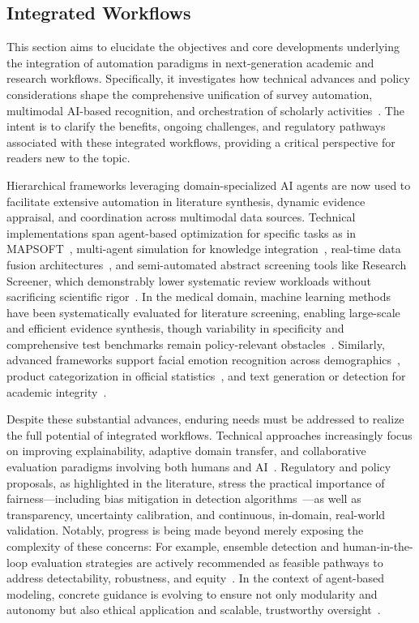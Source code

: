 \documentclass[sigconf]{acmart}
\begin{document}
\subsection{Integrated Workflows}

This section aims to elucidate the objectives and core developments underlying the integration of automation paradigms in next-generation academic and research workflows. Specifically, it investigates how technical advances and policy considerations shape the comprehensive unification of survey automation, multimodal AI-based recognition, and orchestration of scholarly activities~\cite{ref25,ref26,ref27,ref29,ref30,ref45,ref86,ref99,ref100,ref104,ref110,ref111,ref113}. The intent is to clarify the benefits, ongoing challenges, and regulatory pathways associated with these integrated workflows, providing a critical perspective for readers new to the topic.

Hierarchical frameworks leveraging domain-specialized AI agents are now used to facilitate extensive automation in literature synthesis, dynamic evidence appraisal, and coordination across multimodal data sources. Technical implementations span agent-based optimization for specific tasks as in MAPSOFT~\cite{ref25}, multi-agent simulation for knowledge integration~\cite{ref26}, real-time data fusion architectures~\cite{ref27}, and semi-automated abstract screening tools like Research Screener, which demonstrably lower systematic review workloads without sacrificing scientific rigor~\cite{ref29}. In the medical domain, machine learning methods have been systematically evaluated for literature screening, enabling large-scale and efficient evidence synthesis, though variability in specificity and comprehensive test benchmarks remain policy-relevant obstacles~\cite{ref30}. Similarly, advanced frameworks support facial emotion recognition across demographics~\cite{ref45}, product categorization in official statistics~\cite{ref86}, and text generation or detection for academic integrity~\cite{ref99,ref100,ref104,ref110,ref111}.

Despite these substantial advances, enduring needs must be addressed to realize the full potential of integrated workflows. Technical approaches increasingly focus on improving explainability, adaptive domain transfer, and collaborative evaluation paradigms involving both humans and AI~\cite{ref30,ref45,ref86,ref99,ref100,ref104,ref110,ref111,ref113}. Regulatory and policy proposals, as highlighted in the literature, stress the practical importance of fairness---including bias mitigation in detection algorithms~\cite{ref100}---as well as transparency, uncertainty calibration, and continuous, in-domain, real-world validation. Notably, progress is being made beyond merely exposing the complexity of these concerns: For example, ensemble detection and human-in-the-loop evaluation strategies are actively recommended as feasible pathways to address detectability, robustness, and equity~\cite{ref100}. In the context of agent-based modeling, concrete guidance is evolving to ensure not only modularity and autonomy but also ethical application and scalable, trustworthy oversight~\cite{ref114,ref115}.
\end{document}
